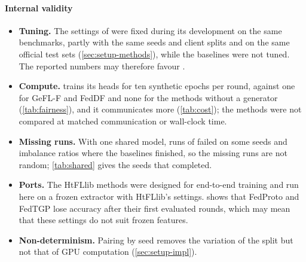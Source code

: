 \paragraph{Internal validity}
\begin{itemize}
\item \textbf{Tuning.} The settings of \ours were fixed during its development on the same benchmarks, partly with
the same seeds and client splits and on the same official test sets (\cref{sec:setup-methods}), while the baselines
were not tuned. The reported numbers may therefore favour \ours.
\item \textbf{Compute.} \ours trains its heads for ten synthetic epochs per round, against one for GeFL-F and FedDF
and none for the methods without a generator (\cref{tab:fairness}), and it communicates more (\cref{tab:cost}); the
methods were not compared at matched communication or wall-clock time.
\item \textbf{Missing runs.}  With one shared model, runs of \ours failed on some seeds and imbalance ratios
where the baselines finished, so the missing runs are not random; \cref{tab:shared} gives the seeds that completed.
\item \textbf{Ports.} The HtFLlib methods were designed for end-to-end training and run here on a frozen extractor
with HtFLlib's settings.  shows that FedProto and FedTGP lose accuracy after their first evaluated
rounds, which may mean that these settings do not suit frozen features.
\item \textbf{Non-determinism.} Pairing by seed removes the variation of the split but not that of GPU computation
(\cref{sec:setup-impl}).
\end{itemize}

